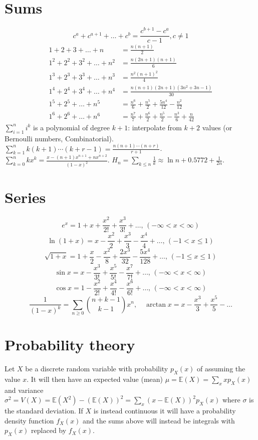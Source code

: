 \section{Sums}
\[ c^a + c^{a+1} + \dots + c^{b} = \frac{c^{b+1} - c^a}{c-1}, c \neq 1 \]
\begin{align*}
	1 + 2 + 3 + \dots + n &= \frac{n(n+1)}{2} \\
	1^2 + 2^2 + 3^2 + \dots + n^2 &= \frac{n(2n+1)(n+1)}{6} \\
	1^3 + 2^3 + 3^3 + \dots + n^3 &= \frac{n^2(n+1)^2}{4} \\
	1^4 + 2^4 + 3^4 + \dots + n^4 &= \frac{n(n+1)(2n+1)(3n^2 + 3n - 1)}{30} \\
	1^5 + 2^5 + \dots + n^5 &= \frac{n^6}{6}+\frac{n^5}{2}+\frac{5n^4}{12}-\frac{n^2}{12} \\
	1^6 + 2^6 + \dots + n^6 &= \frac{n^7}{7}+\frac{n^6}{2}+\frac{n^5}{2}-\frac{n^3}{6}+\frac{n}{42}
\end{align*}
$\sum_{i=1}^n i^k$ is a polynomial of degree $k+1$: interpolate from $k+2$ values (or Bernoulli numbers, Combinatorial).
$\sum_{k=1}^n k(k+1)\cdots(k+r-1) = \frac{n(n+1)\cdots(n+r)}{r+1}$.
$\sum_{k=0}^n k x^k = \frac{x - (n+1)x^{n+1} + nx^{n+2}}{(1-x)^2}$.
$H_n = \sum_{k\le n} \frac1k \approx \ln n + 0.5772 + \frac{1}{2n}$.

\section{Series}
$$e^x = 1+x+\frac{x^2}{2!}+\frac{x^3}{3!}+\dots,\,(-\infty<x<\infty)$$
$$\ln(1+x) = x-\frac{x^2}{2}+\frac{x^3}{3}-\frac{x^4}{4}+\dots,\,(-1<x\leq1)$$
$$\sqrt{1+x} = 1+\frac{x}{2}-\frac{x^2}{8}+\frac{2x^3}{32}-\frac{5x^4}{128}+\dots,\,(-1\leq x\leq1)$$
$$\sin x = x-\frac{x^3}{3!}+\frac{x^5}{5!}-\frac{x^7}{7!}+\dots,\,(-\infty<x<\infty)$$
$$\cos x = 1-\frac{x^2}{2!}+\frac{x^4}{4!}-\frac{x^6}{6!}+\dots,\,(-\infty<x<\infty)$$
$$\frac{1}{(1-x)^{k}} = \sum_{n \ge 0}\binom{n+k-1}{k-1}x^n, \quad
\arctan x = x - \frac{x^3}{3} + \frac{x^5}{5} - \dots$$

\section{Probability theory}
Let $X$ be a discrete random variable with probability $p_X(x)$ of assuming the value $x$. It will then have an expected value (mean) $\mu=\mathbb{E}(X)=\sum_xxp_X(x)$ and variance $\sigma^2=V(X)=\mathbb{E}(X^2)-(\mathbb{E}(X))^2=\sum_x(x-\mathbb{E}(X))^2p_X(x)$ where $\sigma$ is the standard deviation. If $X$ is instead continuous it will have a probability density function $f_X(x)$ and the sums above will instead be integrals with $p_X(x)$ replaced by $f_X(x)$.

